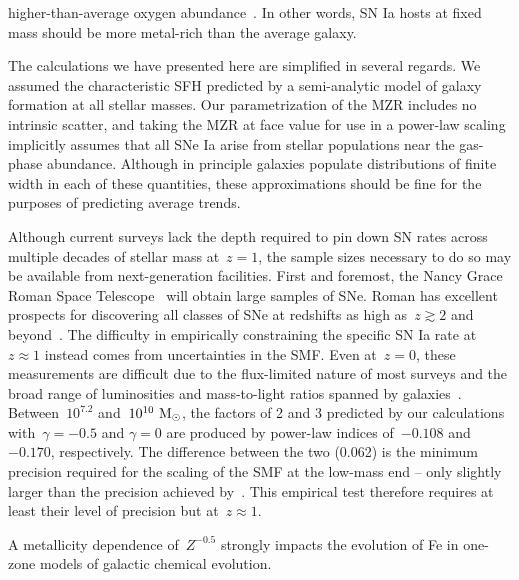 \documentclass[foo.tex]{subfiles}
\begin{document}
higher-than-average oxygen abundance~\citep[see, e.g.,][]{Johnson2020}.
In other words, SN Ia hosts at fixed mass should be more metal-rich than the
average galaxy.
\par
The calculations we have presented here are simplified in several regards.
We assumed the characteristic SFH predicted by a semi-analytic model of
galaxy formation at all stellar masses.
Our parametrization of the MZR includes no intrinsic scatter, and taking the
\citet{Zahid2014} MZR at face value for use in a power-law scaling implicitly
assumes that all SNe Ia arise from stellar populations near the gas-phase
abundance.
Although in principle galaxies populate distributions of finite width in each
of these quantities, these approximations should be fine for the purposes of
predicting average trends.
\par
Although current surveys lack the depth required to pin down SN rates across
multiple decades of stellar mass at~$z = 1$, the sample sizes necessary to do
so may be available from next-generation facilities.
First and foremost, the Nancy Grace Roman Space Telescope~\citep{Spergel2013,
Spergel2015} will obtain large samples of SNe.
Roman has excellent prospects for discovering all classes of SNe at redshifts
as high as~$z \gtrsim 2$ and beyond~\citep{Petrushevska2016}.
The difficulty in empirically constraining the specific SN Ia rate at
$z \approx 1$ instead comes from uncertainties in the SMF.
Even at~$z = 0$, these measurements are difficult due to the flux-limited
nature of most surveys and the broad range of luminosities and mass-to-light
ratios spanned by galaxies~\citep[see the discussion in][]{Weigel2016}.
Between~$10^{7.2}$ and~$10^{10}~\text{M}_\odot$, the factors of 2 and 3 predicted by our
calculations with~$\gamma = -0.5$ and $\gamma = 0$ are produced by power-law
indices of~$-0.108$ and~$-0.170$, respectively.
The difference between the two (0.062) is the minimum precision required for
the scaling of the SMF at the low-mass end -- only slightly larger than the
precision achieved by~\citet[][$\pm 0.05$, see their Fig. 13]{Baldry2012}.
This empirical test therefore requires at least their level of precision but
at~$z \approx 1$.
\par
A metallicity dependence of~$Z^{-0.5}$ strongly impacts the evolution of Fe
in one-zone models of galactic chemical evolution.
\end{document}
